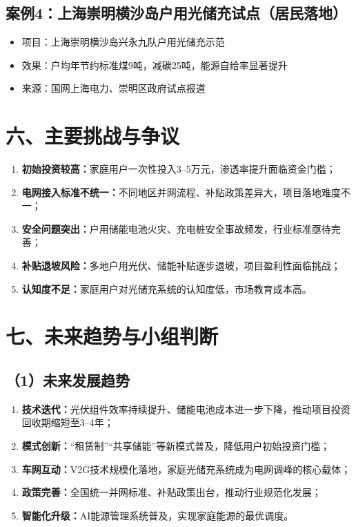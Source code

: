 \documentclass[12pt,a4paper,UTF8]{ctexart}
\begin{document}
\subsection*{案例4：上海崇明横沙岛户用光储充试点（居民落地）}
\begin{itemize}
    \item 项目：上海崇明横沙岛兴永九队户用光储充示范
    \item 效果：户均年节约标准煤9吨，减碳25吨，能源自给率显著提升
    \item 来源：国网上海电力、崇明区政府试点报道
\end{itemize}

\section*{六、主要挑战与争议}
\begin{enumerate}
    \item \textbf{初始投资较高：}家庭用户一次性投入3--5万元，渗透率提升面临资金门槛；
    \item \textbf{电网接入标准不统一：}不同地区并网流程、补贴政策差异大，项目落地难度不一；
    \item \textbf{安全问题突出：}户用储能电池火灾、充电桩安全事故频发，行业标准亟待完善；
    \item \textbf{补贴退坡风险：}多地户用光伏、储能补贴逐步退坡，项目盈利性面临挑战；
    \item \textbf{认知度不足：}家庭用户对光储充系统的认知度低，市场教育成本高。
\end{enumerate}

\section*{七、未来趋势与小组判断}
\subsection*{（1）未来发展趋势}
\begin{enumerate}
    \item \textbf{技术迭代：}光伏组件效率持续提升、储能电池成本进一步下降，推动项目投资回收期缩短至3--4年；
    \item \textbf{模式创新：}“租赁制”“共享储能”等新模式普及，降低用户初始投资门槛；
    \item \textbf{车网互动：}V2G技术规模化落地，家庭光储充系统成为电网调峰的核心载体；
    \item \textbf{政策完善：}全国统一并网标准、补贴政策出台，推动行业规范化发展；
    \item \textbf{智能化升级：}AI能源管理系统普及，实现家庭能源的最优调度。
\end{enumerate}
\end{document}
